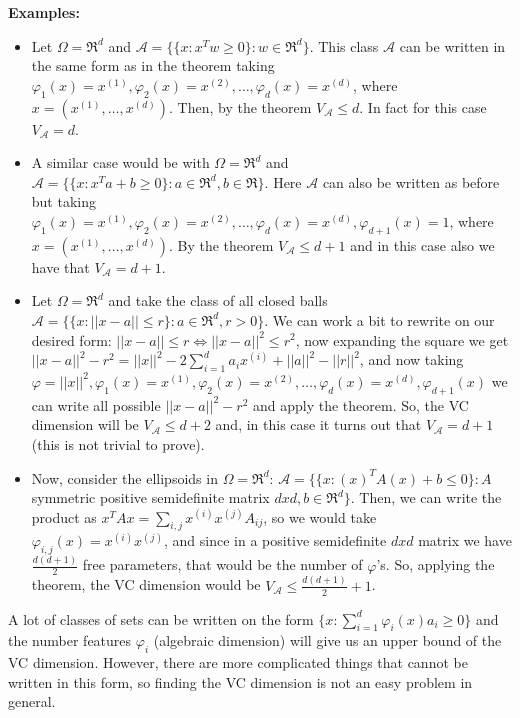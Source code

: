 \documentclass[11pt, english]{article}
\newcommand{\su}[2]{\sum\limits_{#1}^{#2}}
\begin{document}
\textbf{Examples:}
\begin{itemize}
	\item Let $\Omega=\Re^d$ and $\mathcal{A}=\{\{x:x^Tw\geq 0\}:w\in\Re^d\}$. This class $\mathcal{A}$ can be written in the same form as in the theorem taking $\varphi_1(x)=x^{(1)},\varphi_2(x)=x^{(2)},\dots,\varphi_d(x)=x^{(d)}$, where $x=(x^{(1)},\dots,x^{(d)})$. Then, by the theorem $V_{\mathcal{A}}\leq d$. In fact for this case $V_{\mathcal{A}}=d$.
	\item A similar case would be with $\Omega=\Re^d$ and $\mathcal{A}=\{\{x:x^Ta+b\geq 0\}:a\in\Re^d,b\in\Re\}$. Here $\mathcal{A}$ can also be written as before but taking $\varphi_1(x)=x^{(1)},\varphi_2(x)=x^{(2)},\dots,\varphi_d(x)=x^{(d)},\varphi_{d+1}(x)=1$, where $x=(x^{(1)},\dots,x^{(d)})$. By the theorem $V_{\mathcal{A}}\leq d+1$ and in this case also we have that $V_{\mathcal{A}}=d+1$.
	\item Let $\Omega=\Re^d$ and take the class of all closed balls $\mathcal{A}=\{\{x:||x-a||\leq r\}:a\in\Re^d,r>0 \}$. We can work a bit to rewrite on our desired form: $||x-a||\leq r\Leftrightarrow ||x-a||^2\leq r^2$, now expanding the square we get $||x-a||^2-r^2=||x||^2-2\su{i=1}{d}a_ix^{(i)}+||a||^2-||r||^2$, and now taking $\varphi=||x||^2,\varphi_1(x)=x^{(1)},\varphi_2(x)=x^{(2)},\dots,\varphi_d(x)=x^{(d)},\varphi_{d+1}(x)$ we can write all possible $||x-a||^2-r^2$ and apply the theorem. So, the VC dimension will be $V_{\mathcal{A}}\leq d+2$ and, in this case it turns out that $V_{\mathcal{A}}=d+1$ (this is not trivial to prove).
	\item Now, consider the ellipsoids in $\Omega=\Re^d$: $\mathcal{A}=\{\{x:(x)^TA(x)+b\leq 0\}:A$ symmetric positive semidefinite matrix $dxd,b\in\Re^d\}$. Then, we can write the product as $x^TAx=\su{i,j}{}x^{(i)}x^{(j)}A_{ij}$, so we would take $\varphi_{i,j}(x)=x^{(i)}x^{(j)}$, and since in a positive semidefinite $dxd$ matrix we have $\frac{d(d+1)}{2}$ free parameters, that would be the number of $\varphi$'s. So, applying the theorem, the VC dimension would be $V_{\mathcal{A}}\leq\frac{d(d+1)}{2}+1$.

\end{itemize}
A lot of classes of sets can be written on the form $\{x:\su{i=1}{d}\varphi_i(x)a_i\geq 0\}$ and the number features $\varphi_i$ (algebraic dimension) will give us an upper bound of the VC dimension. However, there are more complicated things that cannot be written in this form, so finding the VC dimension is not an easy problem in general.\\
\end{document}
